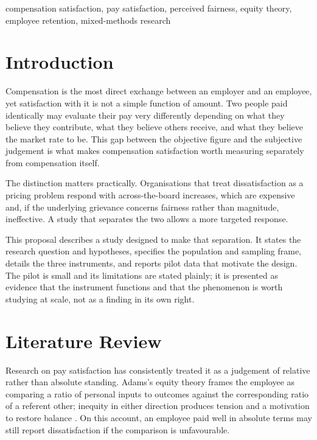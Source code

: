 \documentclass[conference]{IEEEtran}
\begin{document}
\begin{IEEEkeywords}
compensation satisfaction, pay satisfaction, perceived fairness, equity
theory, employee retention, mixed-methods research
\end{IEEEkeywords}

\section{Introduction}

Compensation is the most direct exchange between an employer and an
employee, yet satisfaction with it is not a simple function of amount.
Two people paid identically may evaluate their pay very differently
depending on what they believe they contribute, what they believe others
receive, and what they believe the market rate to be. This gap between
the objective figure and the subjective judgement is what makes
compensation satisfaction worth measuring separately from compensation
itself.

The distinction matters practically. Organisations that treat
dissatisfaction as a pricing problem respond with across-the-board
increases, which are expensive and, if the underlying grievance concerns
fairness rather than magnitude, ineffective. A study that separates the
two allows a more targeted response.

This proposal describes a study designed to make that separation. It
states the research question and hypotheses, specifies the population and
sampling frame, details the three instruments, and reports pilot data
that motivate the design. The pilot is small and its limitations are
stated plainly; it is presented as evidence that the instrument functions
and that the phenomenon is worth studying at scale, not as a finding in
its own right.

\section{Literature Review}

Research on pay satisfaction has consistently treated it as a judgement
of relative rather than absolute standing. Adams's equity theory frames
the employee as comparing a ratio of personal inputs to outcomes against
the corresponding ratio of a referent other; inequity in either direction
produces tension and a motivation to restore balance \cite{adams1963inequity}.
On this account, an employee paid well in absolute terms may still report
dissatisfaction if the comparison is unfavourable.
\end{document}
